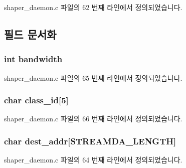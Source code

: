shaper\+\_\+daemon.\+c 파일의 62 번째 라인에서 정의되었습니다.



\subsection{필드 문서화}
\subsubsection[{\texorpdfstring{bandwidth}{bandwidth}}]{\setlength{\rightskip}{0pt plus 5cm}int bandwidth}\hypertarget{structstream__da_a71b420b9a271ff67fe17d3f93d6a81b1}{}\label{structstream__da_a71b420b9a271ff67fe17d3f93d6a81b1}


shaper\+\_\+daemon.\+c 파일의 65 번째 라인에서 정의되었습니다.

\subsubsection[{\texorpdfstring{class\+\_\+id}{class_id}}]{\setlength{\rightskip}{0pt plus 5cm}char class\+\_\+id\mbox{[}5\mbox{]}}\hypertarget{structstream__da_a04a01ac17f2b59581f15f1a4ff5c99d0}{}\label{structstream__da_a04a01ac17f2b59581f15f1a4ff5c99d0}


shaper\+\_\+daemon.\+c 파일의 66 번째 라인에서 정의되었습니다.

\subsubsection[{\texorpdfstring{dest\+\_\+addr}{dest_addr}}]{\setlength{\rightskip}{0pt plus 5cm}char dest\+\_\+addr\mbox{[}{\bf S\+T\+R\+E\+A\+M\+D\+A\+\_\+\+L\+E\+N\+G\+TH}\mbox{]}}\hypertarget{structstream__da_a48e2dd031360cb9786e3650c897a3d44}{}\label{structstream__da_a48e2dd031360cb9786e3650c897a3d44}


shaper\+\_\+daemon.\+c 파일의 64 번째 라인에서 정의되었습니다.

